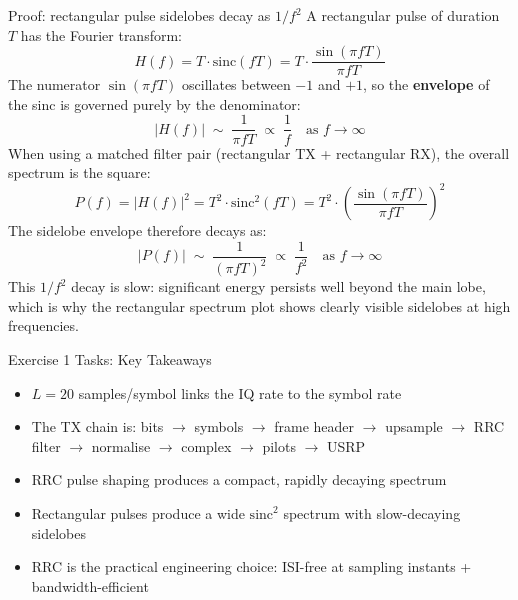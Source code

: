 \begin{KeyBox}{Proof: rectangular pulse sidelobes decay as $1/f^2$}
A rectangular pulse of duration $T$ has the Fourier transform:
\begin{equation}
H(f) = T \cdot \mathrm{sinc}(fT) = T \cdot \frac{\sin(\pi f T)}{\pi f T}
\end{equation}
The numerator $\sin(\pi fT)$ oscillates between $-1$ and $+1$, so the \textbf{envelope} of the sinc is governed purely by the denominator:
\begin{equation}
|H(f)| \;\sim\; \frac{1}{\pi f T} \;\propto\; \frac{1}{f} \quad \text{as } f \to \infty
\end{equation}
When using a matched filter pair (rectangular TX + rectangular RX), the overall spectrum is the square:
\begin{equation}
P(f) = |H(f)|^2 = T^2 \cdot \mathrm{sinc}^2(fT) = T^2 \cdot \left(\frac{\sin(\pi f T)}{\pi f T}\right)^2
\end{equation}
The sidelobe envelope therefore decays as:
\begin{equation}
|P(f)| \;\sim\; \frac{1}{(\pi f T)^2} \;\propto\; \frac{1}{f^2} \quad \text{as } f \to \infty
\end{equation}
This $1/f^2$ decay is slow: significant energy persists well beyond the main lobe, which is why the rectangular spectrum plot shows clearly visible sidelobes at high frequencies.
\end{KeyBox}

\vspace{5cm}

\begin{SummaryBox}{Exercise 1 Tasks: Key Takeaways}
\begin{itemize}
\item $L = 20$ samples/symbol links the IQ rate to the symbol rate
\item The TX chain is: bits $\rightarrow$ symbols $\rightarrow$ frame header $\rightarrow$ upsample $\rightarrow$ RRC filter $\rightarrow$ normalise $\rightarrow$ complex $\rightarrow$ pilots $\rightarrow$ USRP
\item RRC pulse shaping produces a compact, rapidly decaying spectrum
\item Rectangular pulses produce a wide $\mathrm{sinc}^2$ spectrum with slow-decaying sidelobes
\item RRC is the practical engineering choice: ISI-free at sampling instants + bandwidth-efficient
\end{itemize}
\end{SummaryBox}

